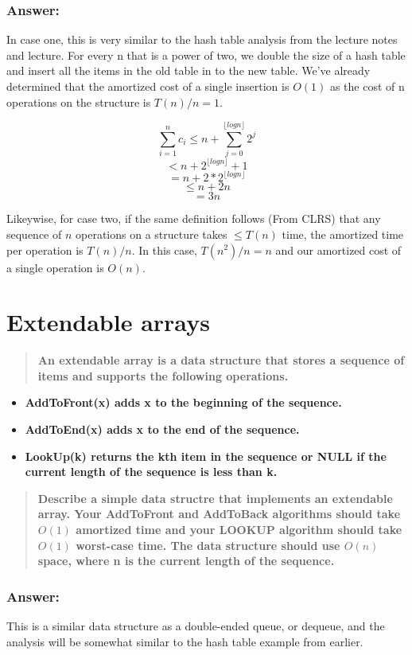\documentclass[titlepage]{article}\usepackage[]{graphicx}\usepackage[]{color}
\begin{document}
\subsubsection{Answer: }
In case one, this is very similar to the hash table analysis from the lecture
notes and lecture. For every n that is a power of two, we double the size of a
hash table and insert all the items in the old table in to the new table. We've
already determined that the amortized cost of a single insertion is $O(1)$ as
the cost of n operations on the structure is $T(n)/n = 1$. 

\[ \sum_{i=1}^n c_i \leq n + \sum_{j=0}^{\lfloor log n \rfloor} 2^j \]
\[ < n + 2^{\lfloor log n \rfloor} +1 \]
\[ = n + 2 * 2^{\lfloor log n \rfloor} \] 
\[\leq n + 2n \]
\[ = 3n \]

Likeywise, for case two, if the same definition follows (From CLRS) that any
sequence of $n$ operations on a structure takes $\leq T(n)$ time, the amortized
time per operation is $T(n)/n$. In this case, $T(n^2)/n = n$ and our amortized
cost of a single operation is $O(n)$. 


\section{Extendable arrays}
\begin{quote}
  \textbf{An extendable array is a data structure that stores a sequence of
  items and supports the following operations.}
\end{quote}

\begin{itemize}
  \item \textbf{AddToFront(x) adds x to the beginning of the sequence.}
  \item \textbf{AddToEnd(x) adds x to the end of the sequence.}
  \item \textbf{LookUp(k) returns the kth item in the sequence or NULL if the
	current length of the sequence is less than k. }
\end{itemize}
\begin{quote}
  \textbf{Describe a simple data structre that implements an extendable array.
	Your AddToFront and AddToBack algorithms should take $O(1)$ amortized time
	and your LOOKUP algorithm should take $O(1)$ worst-case time. The data
	structure should use $O(n)$ space, where n is the current length of the
  sequence.}
\end{quote}

\subsubsection{Answer:}
This is a similar data structure as a double-ended queue, or dequeue, and the
analysis will be somewhat similar to the hash table example from earlier. 
\end{document}
